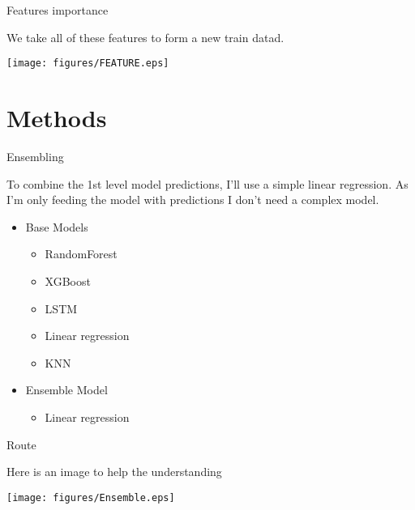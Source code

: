 \documentclass[
 size=12pt,
 paper=smartboard, %
 mode=present, %
 display=slides, %
 style=tuliplab,  %
 pauseslide,
 fleqn,leqno,clock]{powerdot}
\begin{document}
\begin{slide}{Features importance}

	We take all of these features
	to form a new train datad.

	\begin{center}
		\texttt{[image: figures/FEATURE.eps]}
	\end{center}

\end{slide}

\section{Methods}

\begin{slide}{Ensembling}

	To combine the 1st level model predictions,
	I'll use a simple linear regression.
	As I'm only feeding the model with
	predictions I don't need a complex model.

	\begin{center}
		\begin{itemize}
			\item Base Models
			      \
			      \begin{itemize}
				      \item RandomForest
				      \item XGBoost
				      \item LSTM
				      \item Linear regression
				      \item KNN
			      \end{itemize}
			\item Ensemble Model
			      \
			      \begin{itemize}
				      \item Linear regression
			      \end{itemize}
		\end{itemize}
	\end{center}
\end{slide}

\begin{slide}{Route}

	Here is an image to help the understanding

	\begin{center}
		\texttt{[image: figures/Ensemble.eps]}
	\end{center}

\end{slide}
\end{document}
